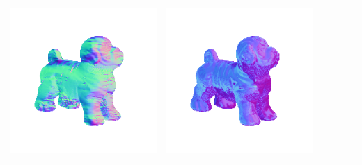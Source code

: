 \begin{tabularx}{\linewidth}{@{}Y@{}Y@{}Y@{}Y@{}Y@{}Y@{}}
\includegraphics[width=\linewidth]{semisynthetic/20150514_17_yu_out.png} &
\includegraphics[width=\linewidth]{semisynthetic/20150514_17_dpsn_out.png} &

\end{tabularx}
